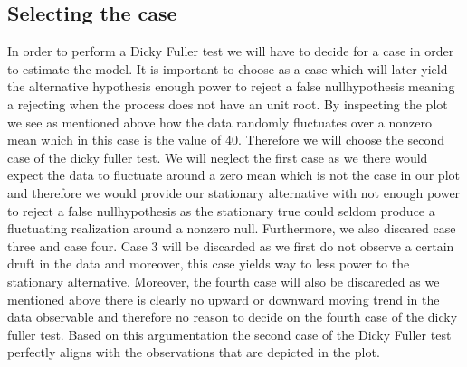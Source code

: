 \documentclass[a4paper,12pt]{article}
\begin{document}
\subsection{Selecting the case}
In order to perform a Dicky Fuller test we will have to decide for a case in order to estimate the model.
It is important to choose as a case which will later yield the alternative hypothesis enough power to reject a false nullhypothesis meaning a rejecting when the process does not have an unit root.
By inspecting the plot we see as mentioned above how the data randomly fluctuates over a nonzero mean which in this case is the value of 40. Therefore we will choose the second case of the dicky fuller test. We will neglect the first case as we there would expect the data to fluctuate around a zero mean which is not the case in our plot and therefore we would provide our stationary alternative with not enough power to reject a false nullhypothesis as the stationary true could seldom produce a fluctuating realization around a nonzero null. Furthermore, we also discared case three and case four. Case 3 will be discarded as we first do not observe a certain druft in the data and moreover, this case yields way to less power to the stationary alternative. Moreover, the fourth case will also be discareded as we mentioned above there is clearly no upward or downward moving trend in the data observable and therefore no reason to decide on the fourth case of the dicky fuller test.
Based on this argumentation the second case of the Dicky Fuller test perfectly aligns with the observations that are depicted in the plot.
\end{document}
